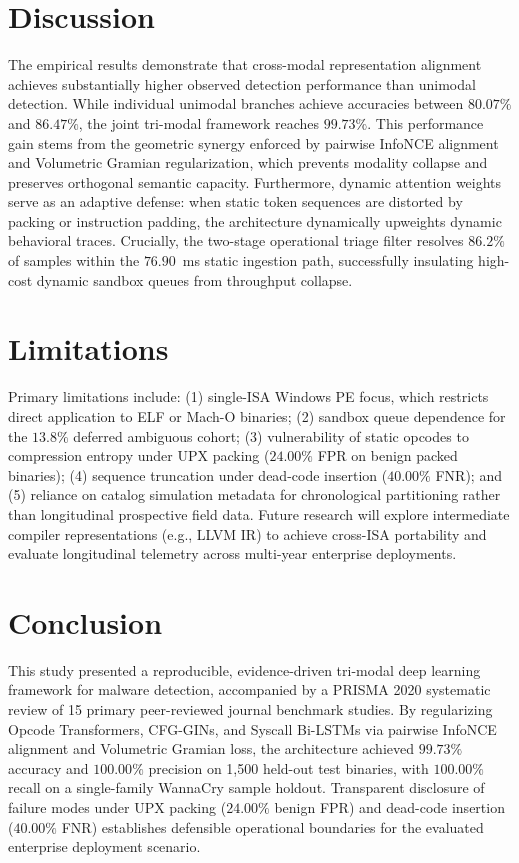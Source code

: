 \documentclass[pdflatex,sn-mathphys-num]{sn-jnl}
\begin{document}
\section{Discussion}\label{sec:discussion}
The empirical results demonstrate that cross-modal representation alignment achieves substantially higher observed detection performance than unimodal detection. While individual unimodal branches achieve accuracies between $80.07\%$ and $86.47\%$, the joint tri-modal framework reaches $99.73\%$. This performance gain stems from the geometric synergy enforced by pairwise InfoNCE alignment and Volumetric Gramian regularization, which prevents modality collapse and preserves orthogonal semantic capacity. Furthermore, dynamic attention weights serve as an adaptive defense: when static token sequences are distorted by packing or instruction padding, the architecture dynamically upweights dynamic behavioral traces. Crucially, the two-stage operational triage filter resolves $86.2\%$ of samples within the $76.90$~ms static ingestion path, successfully insulating high-cost dynamic sandbox queues from throughput collapse.

\section{Limitations}\label{sec:limitations}
Primary limitations include: (1) single-ISA Windows PE focus, which restricts direct application to ELF or Mach-O binaries; (2) sandbox queue dependence for the $13.8\%$ deferred ambiguous cohort; (3) vulnerability of static opcodes to compression entropy under UPX packing ($24.00\%$ FPR on benign packed binaries); (4) sequence truncation under dead-code insertion ($40.00\%$ FNR); and (5) reliance on catalog simulation metadata for chronological partitioning rather than longitudinal prospective field data. Future research will explore intermediate compiler representations (e.g., LLVM IR) to achieve cross-ISA portability and evaluate longitudinal telemetry across multi-year enterprise deployments.

\section{Conclusion}\label{sec:conclusion}
This study presented a reproducible, evidence-driven tri-modal deep learning framework for malware detection, accompanied by a PRISMA 2020 systematic review of 15 primary peer-reviewed journal benchmark studies. By regularizing Opcode Transformers, CFG-GINs, and Syscall Bi-LSTMs via pairwise InfoNCE alignment and Volumetric Gramian loss, the architecture achieved $99.73\%$ accuracy and $100.00\%$ precision on 1,500 held-out test binaries, with $100.00\%$ recall on a single-family WannaCry sample holdout. Transparent disclosure of failure modes under UPX packing ($24.00\%$ benign FPR) and dead-code insertion ($40.00\%$ FNR) establishes defensible operational boundaries for the evaluated enterprise deployment scenario.
\end{document}
